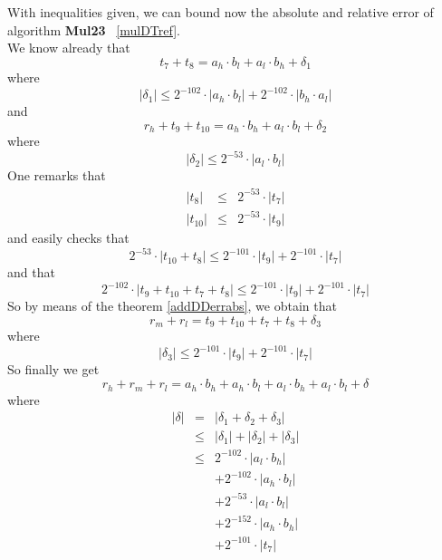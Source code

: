 \documentclass[a4paper,10pt,twoside]{article}
\newenvironment{proof}[1][Proof]{\begin{trivlist}
\item[\hskip \labelsep {\bfseries #1}]}{\end{trivlist}}
\newcommand{\hi}{\ensuremath{\mathit{h}}}
\newcommand{\mi}{\ensuremath{\mathit{m}}}
\newcommand{\lo}{\ensuremath{\mathit{l}}}
\newcommand{\MulDT}{{\bf Mul23}}
\begin{document}
\begin{proof}
With inequalities given, we can bound now the absolute and relative error of algorithm \MulDT~ \ref{mulDTref}. \\
We know already that
$$t_7 + t_8 = a_\hi \cdot b_\lo + a_\lo \cdot b_\hi + \delta_1$$
where
$$\left \vert \delta_1 \right \vert \leq 2^{-102} \cdot \left \vert a_\hi \cdot b_\lo \right \vert +
                                         2^{-102} \cdot \left \vert b_\hi \cdot a_\lo \right \vert$$
and
$$r_\hi + t_9 + t_{10} = a_\hi \cdot b_\hi + a_\lo \cdot b_\lo + \delta_2$$
where
$$\left \vert \delta_2 \right \vert \leq 2^{-53} \cdot \left \vert a_\lo \cdot b_\lo \right \vert$$
One remarks that
\begin{eqnarray*}
\left \vert t_8 \right \vert & \leq & 2^{-53} \cdot \left \vert t_7 \right \vert \\
\left \vert t_{10} \right \vert & \leq & 2^{-53} \cdot \left \vert t_9 \right \vert
\end{eqnarray*}
and easily checks that
$$2^{-53} \cdot \left \vert t_{10} + t_8 \right \vert \leq 2^{-101} \cdot \left \vert t_9 \right \vert + 2^{-101} \cdot \left \vert t_7 \right \vert$$
and that
$$2^{-102} \cdot \left \vert t_9 + t_{10} + t_7 + t_8 \right \vert \leq 2^{-101} \cdot \left \vert t_9 \right \vert +
                                                                        2^{-101} \cdot \left \vert t_7 \right \vert$$
So by means of the theorem \ref{addDDerrabs}, we obtain that
$$r_\mi + r_\lo = t_9 + t_{10} + t_7 + t_8 + \delta_3$$
where
$$\left \vert \delta_3 \right \vert \leq 2^{-101} \cdot \left \vert t_9 \right \vert + 2^{-101} \cdot \left \vert t_7 \right \vert$$
So finally we get
$$r_\hi + r_\mi + r_\lo = a_\hi \cdot b_\hi + a_\hi \cdot b_\lo + a_\lo \cdot b_\hi + a_\lo \cdot b_\lo + \delta$$
where
\begin{eqnarray*}
\left \vert \delta \right \vert & = & \left \vert \delta_1 + \delta_2 + \delta_3 \right \vert \\
& \leq & \left \vert \delta_1 \right \vert + \left \vert \delta_2 \right \vert + \left \vert \delta_3 \right \vert \\
& \leq & 2^{-102} \cdot \left \vert a_\lo \cdot b_\hi \right \vert \\
& & + 2^{-102} \cdot \left \vert a_\hi \cdot b_\lo \right \vert \\
& & + 2^{-53} \cdot \left \vert a_\lo \cdot b_\lo \right \vert \\
& & + 2^{-152} \cdot \left \vert a_\hi \cdot b_\hi \right \vert \\
& & + 2^{-101} \cdot \left \vert t_7 \right \vert

\end{eqnarray*}
\end{proof}
\end{document}
